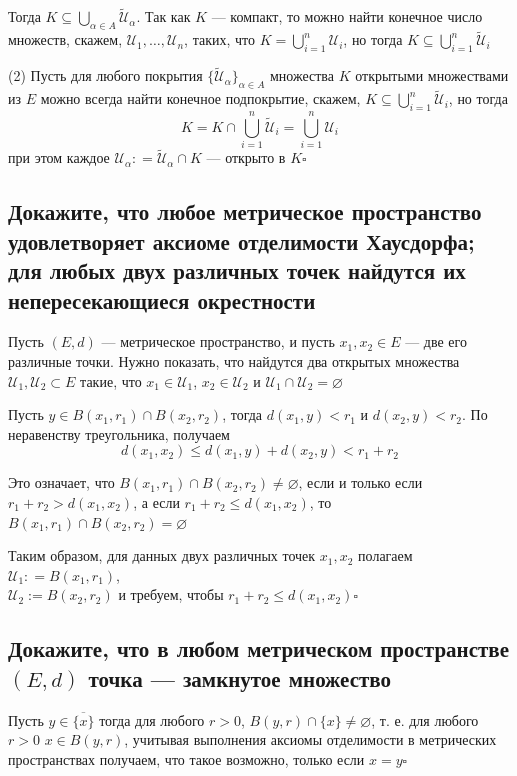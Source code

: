 \documentclass[a4paper]{article}
\newcommand{\qed}{\hfill$\square$}
\begin{document}
Тогда $K \subseteq \displaystyle\bigcup_{\alpha \in A} \widetilde{\mathscr{U}}_\alpha$. Так как $K$ — компакт, то можно найти конечное число множеств, скажем, $\mathscr{U}_1, \ldots, \mathscr{U}_n$, таких, что $K = \displaystyle\bigcup_{i=1}^n\mathscr{U}_i$, но тогда $K \subseteq \displaystyle\bigcup_{i=1}^n \widetilde{\mathscr{U}}_i$

(2) Пусть для любого покрытия $\{\widetilde{\mathscr{U}}_\alpha\}_{\alpha \in A}$ множества $K$ открытыми множествами из $E$ можно всегда найти конечное подпокрытие, скажем, $K \subseteq \displaystyle\bigcup_{i=1}^n \widetilde{\mathscr{U}}_i$, но тогда 
$$
K = K \cap \displaystyle\bigcup_{i=1}^n \widetilde{\mathscr{U}}_i= \displaystyle\bigcup_{i=1}^n \mathscr{U}_i
$$
при этом каждое $\mathscr{U}_\alpha : = \widetilde{\mathscr{U}}_\alpha \cap K$ — открыто в $K$\qed

\subsection{Докажите, что любое метрическое пространство удовлетворяет аксиоме отделимости Хаусдорфа; для любых двух различных точек найдутся их непересекающиеся окрестности}
Пусть $(E,d)$ — метрическое пространство, и пусть $x_1,x_2 \in E$ — две его различные точки. Нужно показать, что найдутся два открытых множества $\mathscr{U}_1, \mathscr{U}_2 \subset E$ такие, что $x_1\in \mathscr{U}_1$, $x_2\in \mathscr{U}_2$ и $\mathscr{U}_1\cap \mathscr{U}_2 = \varnothing$

Пусть $y \in B(x_1,r_1) \cap B(x_2,r_2)$, тогда $d(x_1,y)<r_1$ и $d(x_2,y)<r_2$. По неравенству треугольника, получаем
$$
d(x_1,x_2) \le d(x_1,y) + d(x_2,y)< r_1 +r_2
$$

Это означает, что $B(x_1,r_1) \cap B(x_2,r_2) \ne \varnothing$, если и только если $r_1+r_2 > d(x_1,x_2)$, а если $r_1+r_2 \le d(x_1,x_2)$, то $B(x_1,r_1) \cap B(x_2,r_2) = \varnothing$

Таким образом, для данных двух различных точек $x_1,x_2$ полагаем $\mathscr{U}_1: = B(x_1,r_1)$,\\
$\mathscr{U}_2:=B(x_2,r_2)$ и требуем, чтобы $r_1+r_2 \le d(x_1,x_2)$\qed
\label{2.5}

\subsection{Докажите, что в любом метрическом пространстве $(E, d)$ точка — замкнутое множество}
Пусть $y \in \overline{\{x\}}$ тогда для любого $r>0$, $B(y,r) \cap \{x\} \ne \varnothing$, т. е. для любого $r >0$ $x \in B(y,r)$, учитывая выполнения аксиомы отделимости в метрических пространствах получаем, что такое возможно, только если $x =y$\qed
\end{document}
